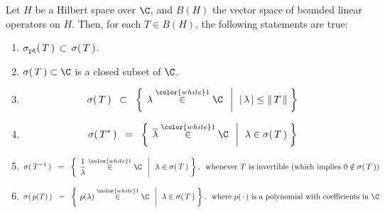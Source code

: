 
\begin{theorem}\mbox{}
\vskip 0.1cm
\noindent
Let $H$ be a Hilbert space over $\C$, and $B(H)$ the vector space of bounded linear operators on $H$.
Then, for each $T \in B(H)$, the following statements are true:
\begin{enumerate}
\item
	$\sigma_{\textnormal{pt}}(\,T\,) \,\subset\, \sigma(\,T\,)$.
\item
	$\sigma(\,T\,) \subset \C$ is a closed subset of $\C$.
\item
	\begin{equation*}
	\sigma(\,T\,)
	\;\; \subset \;\;
		\left\{\;
			\left.
			\lambda \overset{{\color{white}1}}{\in} \C
			\;\;\,\right\vert\;\,
			\vert\,\lambda\,\vert \leq \Vert\,T\,\Vert
			\;\right\}
	\end{equation*}
\item
	\begin{equation*}
	\sigma(\,T^{*}\,)
	\;\; = \;\;
		\left\{\;
			\left.
			\overline{\lambda} \overset{{\color{white}1}}{\in} \C
			\;\;\,\right\vert\;\,
			\lambda \in \sigma(\,T\,)
			\;\right\}
	\end{equation*}
\item
	\begin{equation*}
	\sigma(\,T^{-1}\,)
	\;\; = \;\;
		\left\{\;
			\left.
			\frac{1}{\lambda} \overset{{\color{white}1}}{\in} \C
			\;\;\,\right\vert\;\,
			\lambda \in \sigma(\,T\,)
			\;\right\},
	\;\;\textnormal{whenever $T$ is invertible (which implies $0 \notin \sigma(\,T\,)$)}
	\end{equation*}
\item
	\begin{equation*}
	\sigma(\,p(T)\,)
	\;\; = \;\;
		\left\{\;
			\left.
			p(\lambda) \overset{{\color{white}1}}{\in} \C
			\;\;\,\right\vert\;\,
			\lambda \in \sigma(\,T\,)
			\;\right\},
	\;\;\textnormal{where $p(\,\cdot\,)$ is a polynomial with coefficients in $\C$}
	\end{equation*}
\end{enumerate}
\end{theorem}

